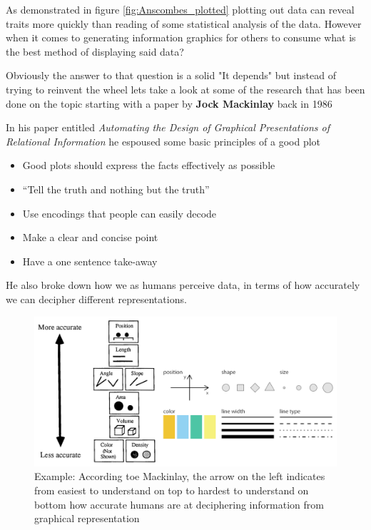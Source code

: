 \documentclass{article}
\begin{document}
\begin{flushleft}
As demonstrated in figure \ref{fig:Anscombes_plotted} plotting out data can reveal traits more quickly than reading of some statistical analysis of the data. However when it comes to generating information graphics for others to consume what is the best method of displaying said data?
\end{flushleft}
\begin{flushleft}
Obviously the answer to that question is a solid "It depends" but instead of trying to reinvent the wheel lets take a look at some of the research that has been done on the topic starting with a paper by \textbf{Jock Mackinlay} back in 1986
\end{flushleft}
\begin{flushleft}
In his paper entitled \textit{Automating the Design of Graphical Presentations of Relational Information} he espoused some basic principles of a good plot
    \begin{itemize}
        \item Good plots should express the facts eﬀectively as possible
        \item “Tell the truth and nothing but the truth”
        \item Use encodings that people can easily decode
        \item Make a clear and concise point
        \item Have a one sentence take-away
    \end{itemize}
\end{flushleft}
\begin{flushleft}
He also broke down how we as humans perceive data, in terms of how accurately we can decipher different representations.
\end{flushleft}
\begin{figure}[H]
    \centering
    \includegraphics[width=.55\textwidth]{data_representation.png}
    \caption{Example: According toe Mackinlay, the arrow on the left indicates from easiest to understand on top to hardest to understand on bottom how accurate humans are at deciphering information from graphical representation}
    \label{fig:data_representation}
\end{figure}
\end{document}
